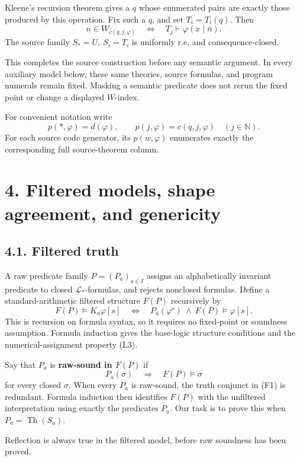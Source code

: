 \documentclass[
  11pt,
  letterpaper,
]{article}
\begin{document}
Kleene's recursion theorem gives a \(q\) whose enumerated pairs are
exactly those produced by this operation. Fix such a \(q\), and set
\(T_i=T_i(q)\). Then \[
n\in W_{c(q,j,\varphi)}
\quad\Longleftrightarrow\quad
T_j\vdash\varphi(x\mid\bar n).
\tag{S7}
\] The source family \(S_*=U,\ S_i=T_i\) is uniformly r.e. and
consequence-closed.

This completes the source construction before any semantic argument. In
every auxiliary model below, these same theories, source formulas, and
program numerals remain fixed. Masking a semantic predicate does not
rerun the fixed point or change a displayed \(W\)-index.

For convenient notation write \[
p(*,\varphi)=d(\varphi),\qquad
p(j,\varphi)=c(q,j,\varphi)\quad(j\in\mathbb N).
\tag{S8}
\] For each source code generator, its \(p(w,\varphi)\) enumerates
exactly the corresponding full source-theorem column.

\section{4. Filtered models, shape agreement, and
genericity}\label{filtered-models-shape-agreement-and-genericity}

\subsection{4.1. Filtered truth}\label{filtered-truth}

A raw predicate family \(P=(P_a)_{a\in I}\) assigns an alphabetically
invariant predicate to closed \(\mathcal L_*\)-formulas, and rejects
nonclosed formulas. Define a standard-arithmetic filtered structure
\(F(P)\) recursively by \[
F(P)\models K_a\varphi[s]
\quad\Longleftrightarrow\quad
P_a(\varphi^s)\ \land\ F(P)\models\varphi[s].
\tag{F1}
\] This is recursion on formula syntax, so it requires no fixed-point or
soundness assumption. Formula induction gives the base-logic structure
conditions and the numerical-assignment property (L3).

Say that \(P_a\) is \textbf{raw-sound in \(F(P)\)} if \[
P_a(\sigma)\quad\Longrightarrow\quad F(P)\models\sigma
\] for every closed \(\sigma\). When every \(P_a\) is raw-sound, the
truth conjunct in (F1) is redundant. Formula induction then identifies
\(F(P)\) with the unfiltered interpretation using exactly the predicates
\(P_a\). Our task is to prove this when \(P_a=\operatorname{Th}(S_a)\).

Reflection is always true in the filtered model, before raw soundness
has been proved.
\end{document}

